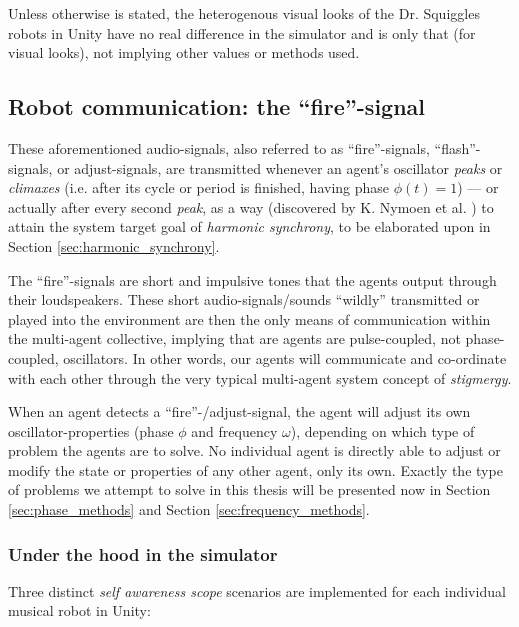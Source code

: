 	Unless otherwise is stated, the heterogenous visual looks of the Dr. Squiggles robots in Unity have no real difference in the simulator and is only that (for visual looks), not implying other values or methods used.

	
	\subsection{Robot communication: the ``fire''-signal}
	\label{subsec:fire_signal}

	These aforementioned audio-signals, also referred to as ``fire''-signals, ``flash''-signals, or adjust-signals, are transmitted whenever an agent's oscillator \textit{peaks} or \textit{climaxes} (i.e. after its cycle or period is finished, having phase $\phi(t)=1$) — or actually after every second \textit{peak}, as a way (discovered by K. Nymoen et al. \cite{nymoen_synch}) to attain the system target goal of \textit{harmonic synchrony}, to be elaborated upon in Section \ref{sec:harmonic_synchrony}.

	The ``fire''-signals are short and impulsive tones that the agents output through their loudspeakers. These short audio-signals/sounds ``wildly'' transmitted or played into the environment are then the only means of communication within the multi-agent collective, implying that are agents are pulse-coupled, not phase-coupled, oscillators. In other words, our agents will communicate and co-ordinate with each other through the very typical multi-agent system concept of \textit{stigmergy}.

	When an agent detects a ``fire''-/adjust-signal, the agent will adjust its own oscillator-properties (phase $\phi$ and frequency $\omega$), depending on which type of problem the agents are to solve. No individual agent is directly able to adjust or modify the state or properties of any other agent, only its own. Exactly the type of problems we attempt to solve in this thesis will be presented now in Section \ref{sec:phase_methods} and Section \ref{sec:frequency_methods}.
	

		\subsubsection{Under the hood in the simulator}
		\label{SA_scopes_implemented}
		
		Three distinct \textit{self awareness scope} scenarios are implemented for each individual musical robot in Unity:
		
